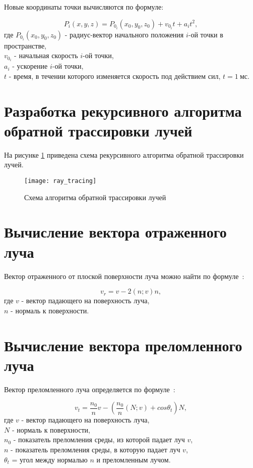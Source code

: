 Новые координаты точки вычисляются по формуле:

\begin{equation}\label{new_pos}
	P_i(x, y, z) = P_{0_i}(x_0, y_0, z_0) + v_{0_i} t + a_i t^2,
\end{equation}
где $P_{0_i}(x_0, y_0, z_0)$ - радиус-вектор начального положения $i$-ой точки в пространстве,\\
\text{~~~~~~}$v_{0_i}$ - начальная скорость $i$-ой точки,\\
\text{~~~~~~}$a_i$ - ускорение $i$-ой точки,\\
\text{~~~~~~}$t$ - время, в течении которого изменяется скорость под действием сил, $t = 1~\text{мс}$.

\section{Разработка рекурсивного алгоритма обратной трассировки лучей}

На рисунке \ref{ray_tracing} приведена схема рекурсивного алгоритма обратной трассировки лучей.

\begin{figure}[H]
	\centering
	\texttt{[image: ray\_tracing]}
	\caption{Схема алгоритма обратной трассировки лучей}
	\label{ray_tracing}
\end{figure}

\section{Вычисление вектора отраженного луча}

Вектор отраженного от плоской поверхности луча можно найти по формуле~\cite{raytracingen}:

\begin{equation}\label{refl}
	v_r = v - 2(n; v)n,
\end{equation}
где $v$ - вектор падающего на поверхность луча,\\
\text{~~~~~~}$n$ - нормаль к поверхности.

\section{Вычисление вектора преломленного луча}

Вектор преломленного луча определяется по формуле~\cite{raytracingen}:

\begin{equation}\label{refr}
	v_t = \frac{n_0}{n} v - (\frac{n_0}{n}(N; v) + cos\theta_t)N,
\end{equation}
где $v$ - вектор падающего на поверхность луча,\\
\text{~~~~~~}$N$ - нормаль к поверхности,\\
\text{~~~~~~}$n_0$ - показатель преломления среды, из которой падает луч $v$,\\
\text{~~~~~~}$n$ - показатель преломления среды, в которую падает луч $v$,\\
\text{~~~~~~}$\theta_t$ = угол между нормалью $n$ и преломленным лучом.

